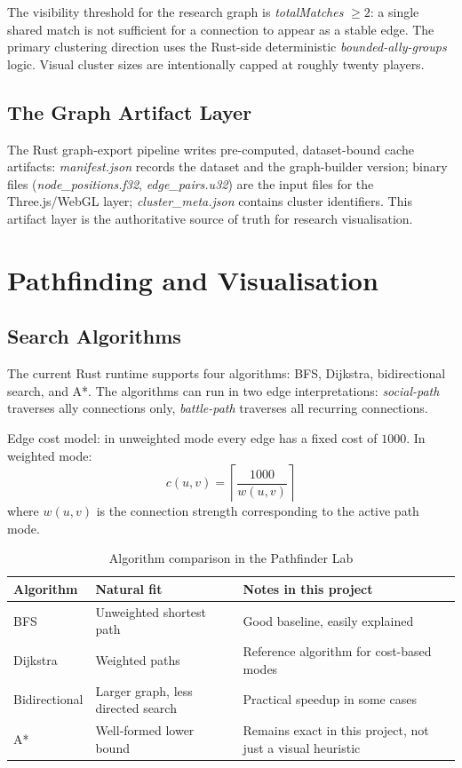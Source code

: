 The visibility threshold for the research graph is \textit{totalMatches} $\geq 2$: a single shared match is not sufficient for a connection to appear as a stable edge. The primary clustering direction uses the Rust-side deterministic \textit{bounded-ally-groups} logic. Visual cluster sizes are intentionally capped at roughly twenty players.

\subsection{The Graph Artifact Layer}

The Rust graph-export pipeline writes pre-computed, dataset-bound cache artifacts: \textit{manifest.json} records the dataset and the graph-builder version; binary files (\textit{node\_positions.f32}, \textit{edge\_pairs.u32}) are the input files for the Three.js/WebGL layer; \textit{cluster\_meta.json} contains cluster identifiers. This artifact layer is the authoritative source of truth for research visualisation.

\section{Pathfinding and Visualisation}

\subsection{Search Algorithms}

The current Rust runtime supports four algorithms: BFS, Dijkstra, bidirectional search, and A*. The algorithms can run in two edge interpretations: \textit{social-path} traverses ally connections only, \textit{battle-path} traverses all recurring connections.

Edge cost model: in unweighted mode every edge has a fixed cost of $1000$. In weighted mode:
\begin{equation}
c(u,v)=\left\lceil \frac{1000}{w(u,v)} \right\rceil
\end{equation}
where $w(u,v)$ is the connection strength corresponding to the active path mode.

\begin{table}[H]
\centering
\caption{Algorithm comparison in the Pathfinder Lab}
\begin{tabularx}{\textwidth}{|>{\raggedright\arraybackslash}p{2.8cm}|>{\raggedright\arraybackslash}p{2.8cm}|X|}
\hline
\textbf{Algorithm} & \textbf{Natural fit} & \textbf{Notes in this project} \\
\hline
BFS & Unweighted shortest path & Good baseline, easily explained \\
Dijkstra & Weighted paths & Reference algorithm for cost-based modes \\
Bidirectional & Larger graph, less directed search & Practical speedup in some cases \\
A* & Well-formed lower bound & Remains exact in this project, not just a visual heuristic \\
\hline
\end{tabularx}
\end{table}

